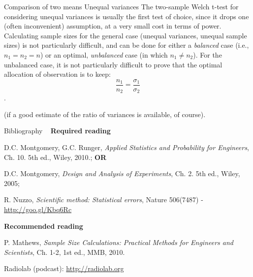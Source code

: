 \documentclass[t]{beamer}
\begin{document}
\begin{ftst}
{Comparison of two means}
{Unequal variances}
The two-sample Welch t-test for considering unequal variances is usually the first test of choice, since it drops one (often inconvenient) assumption, at a very small cost in terms of power.
\vone
Calculating sample sizes for the general case (unequal variances, unequal sample sizes) is not particularly difficult, and can be done for either a \textit{balanced} case (i.e., $n_1 = n_2 = n$) or an optimal, \textit{unbalanced} case (in which $n_1 \neq n_2$).
\vone
For the unbalanced case, it is not particularly difficult to prove that the optimal allocation of observation is to keep:
$$\frac{n_1}{n_2} = \frac{\sigma_1}{\sigma_2}$$.

(if a good estimate of the ratio of variances is available, of course).
\end{ftst}


\begin{ftst}
{Bibliography}
{\ }
\scriptsize
\textbf{Required reading}

\benums D.C. Montgomery, G.C. Runger, \textit{Applied Statistics and Probability for Engineers}, Ch. 10. 5th ed., Wiley, 2010.; \textbf{OR}
\item D.C. Montgomery, \textit{Design and Analysis of Experiments}, Ch. 2. 5th ed., Wiley, 2005;
\item R. Nuzzo, \textit{Scientific method: Statistical errors}, Nature 506(7487) - \url{http://goo.gl/Kbq6Rc}
\eenum

\textbf{Recommended reading}

\benums P. Mathews, \textit{Sample Size Calculations: Practical Methods for Engineers and Scientists}, Ch. 1-2, 1st ed., MMB, 2010.
\item Radiolab (podcast): \url{http://radiolab.org}
\eenum
\end{ftst}




\end{document}
